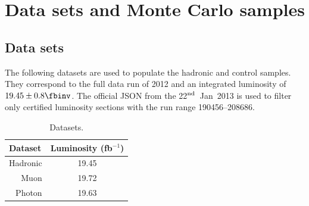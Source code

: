 \clearpage
\section{Data sets and Monte Carlo samples\label{sec:samples}}

\subsection{Data sets\label{sec:datasets}}

The following datasets are used to populate the hadronic and
control samples. They correspond to the full data run of 2012 and an
integrated luminosity of $19.45 \pm 0.8\fbinv$. The official JSON from
the 22$^{\rm nd}$~Jan~2013 is used to filter only certified luminosity
sections with the run range 190456--208686.

\begin{table}[h]
  \caption{Datasets.}
  \label{tab:datasets}
  \centering
  \scriptsize
  \begin{tabular}{ lc }
    \hline
    \hline
    Dataset & Luminosity (fb$^{-1}$) \\
    \hline
    \multicolumn{1}{r}{Hadronic} & 19.45 \\ [0.5ex]
    \multicolumn{1}{r}{Muon} & 19.72 \\ [0.5ex] %
    \multicolumn{1}{r}{Photon} & 19.63 \\ [0.5ex] %
    \hline
    \hline
  \end{tabular}
\end{table}

